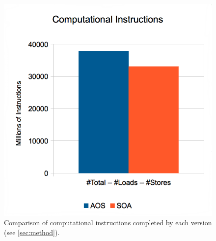 \documentclass[abstract=on,9pt,twocolumn]{scrartcl}
\begin{document}
\begin{figure}[!p]
	\begin{center}
		\includegraphics[width=\columnwidth]{images/report.april/instructions.png}
	\end{center}
	\caption{Comparison of computational instructions completed by each version (see \cref{sec:method}).}
	\label{fig:instructions}
\end{figure}
\end{document}
